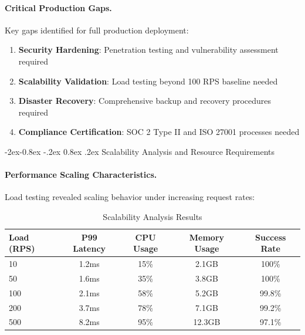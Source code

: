 \documentclass[manuscript,screen,9pt]{acmart}
\makeatletter
\renewcommand\subsubsection{\@startsection{subsubsection}{3}{\z@}%
  {-2ex\@plus -0.8ex \@minus -.2ex}%
  {0.8ex \@plus .2ex}%
  {\normalfont\normalsize\bfseries}}
\newcommand{\tablesize}{\footnotesize}
\newcommand{\tableheader}[1]{\textbf{#1}}
\makeatother
\begin{document}
\paragraph{Critical Production Gaps.}
Key gaps identified for full production deployment:
\begin{enumerate}[leftmargin=*,itemsep=1pt,parsep=1pt]
	\item \textbf{Security Hardening}: Penetration testing and vulnerability assessment required
	\item \textbf{Scalability Validation}: Load testing beyond 100 RPS baseline needed
	\item \textbf{Disaster Recovery}: Comprehensive backup and recovery procedures required
	\item \textbf{Compliance Certification}: SOC 2 Type II and ISO 27001 processes needed
\end{enumerate}

\subsubsection{Scalability Analysis and Resource Requirements}
\label{subsubsec:scalability_analysis}

\paragraph{Performance Scaling Characteristics.}
Load testing revealed scaling behavior under increasing request rates:

\begin{table}[!htb]
	\centering
	\caption{Scalability Analysis Results}
	\label{tab:scalability_analysis}
	\tablesize
	\begin{tabular}{@{}lcccc@{}}
		\toprule
		\tableheader{Load (RPS)} & \tableheader{P99 Latency} & \tableheader{CPU Usage} & \tableheader{Memory Usage} & \tableheader{Success Rate} \\
		\midrule
		10                       & 1.2ms                     & 15\%                    & 2.1GB                      & 100\%                      \\
		50                       & 1.6ms                     & 35\%                    & 3.8GB                      & 100\%                      \\
		100                      & 2.1ms                     & 58\%                    & 5.2GB                      & 99.8\%                     \\
		200                      & 3.7ms                     & 78\%                    & 7.1GB                      & 99.2\%                     \\
		500                      & 8.2ms                     & 95\%                    & 12.3GB                     & 97.1\%                     \\
		\bottomrule
	\end{tabular}
\end{table}
\end{document}
